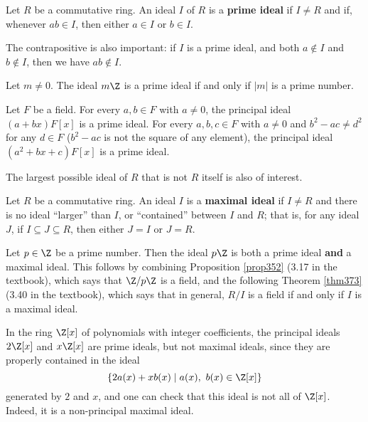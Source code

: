 \documentclass[math1530-lecture-notes]{subfiles}
\begin{document}
\begin{definition}{}
  Let $R$ be a commutative ring. An ideal $I$ of $R$ is a \textbf{prime ideal} if $I\neq R$ and if,
  whenever $ab\in I$, then either $a\in I$ or $b\in I$.
\end{definition}

The contrapositive is also important: if $I$ is a prime ideal, and both $a\not\in I$ and $b\not\in
I$, then we have $ab\not\in I$.

\begin{example}
  Let $m\neq 0$. The ideal $m\Z$ is a prime ideal if and only if $\left| m \right| $ is a prime
  number.
\end{example}
\begin{example}
  Let $F$ be a field. For every $a,b \in F$ with $a\neq 0$, the principal ideal $(a+bx)F[x]$ is a
  prime ideal. For every $a,b,c\in F$ with $a\neq 0$ and $b^2-ac\neq d^2$ for any $d\in F$ 
  ($b^2-ac$ is not the square of any element), the principal ideal $(a^2+bx+c)F[x]$ is a prime
  ideal.
\end{example}

The largest possible ideal of $R$ that is not $R$ itself is also of interest.
\begin{definition}{}
  Let $R$ be a commutative ring. An ideal $I$ is a \textbf{maximal ideal} if $I\neq R$ and there is
  no ideal ``larger'' than $I$, or ``contained'' between $I$ and $R$; that is, for any ideal $J$, if
  $I\subseteq J\subseteq R$, then either $J=I$ or $J=R$.
\end{definition}

\begin{example}
  Let $p\in \Z$ be a prime number. Then the ideal $p\Z$ is both a prime ideal \textbf{and} a maximal
  ideal. This follows by combining Proposition \ref{prop352} (3.17 in the textbook), which says that
  $\Z / p\Z$ is a field, and the following Theorem \ref{thm373} (3.40 in the textbook), which says
  that in general, $R / I$ is a field if and only if $I$ is a maximal ideal.
\end{example}
\begin{example}
  In the ring $\Z[x]$ of polynomials with integer coefficients, the principal ideals $2\Z[x]$ and
  $x\Z[x]$ are prime ideals, but not maximal ideals, since they are properly contained in the ideal
  \[
    \{2a(x)+xb(x)\mid a(x),\ b(x)\in \Z[x]\} 
  \] generated by $2$ and $x$, and one can check that this ideal is not all of $\Z[x]$. Indeed, it
  is a non-principal maximal ideal.
\end{example}
\end{document}

